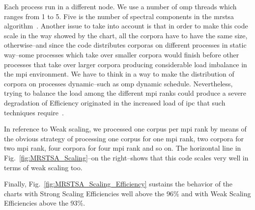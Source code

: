 \documentclass[11pt,a4paper]{article}
\begin{document}
Each process run in a different node. We use a number of \gls{omp} threads which ranges from 1 to 5. Five is the number of spectral components in the \gls{mrstsa} algorithm~\cite{Dematties2018}. Another issue to take into account is that in order to make this code scale in the way showed by the chart, all the corpora have to have the same size, otherwise--and since the code distributes corporas on different processes in static way--some processes which take over smaller corpora would finish before other processes that take over larger corpora producing considerable load imbalance in the \gls{mpi} environment. We have to think in a way to make the distribution of corpora on processes dynamic--such as \gls{omp} dynamic schedule. Nevertheless, trying to balance the load among the different \gls{mpi} ranks could produce a severe degradation of Efficiency originated in the increased load of \gls{ipc} that such techniques require~\cite{hu2012biophysically}.~

In reference to Weak scaling, we processed one corpus per \gls{mpi} rank by means of the obvious strategy of processing one corpus for one \gls{mpi} rank, two corpora for two \gls{mpi} rank, four corpora for four \gls{mpi} rank and so on. The horizontal line in Fig.~\ref{fig:MRSTSA_Scaling}--on the right--shows that this code scales very well  in terms of weak scaling too.

Finally, Fig.~\ref{fig:MRSTSA_Scaling_Efficiency} sustains the behavior of the charts with Strong Scaling Efficiencies well above the 96\% and with Weak Scaling Efficiencies above the 93\%.
\end{document}
